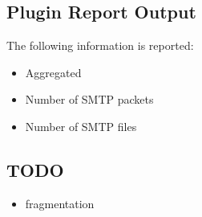 \documentclass[documentation]{subfiles}
\begin{document}
\subsection{Plugin Report Output}
The following information is reported:
\begin{itemize}
    \item Aggregated {\tt{}}
    \item Number of SMTP packets
    \item Number of SMTP files
\end{itemize}

\subsection{TODO}
\begin{itemize}
    \item fragmentation
\end{itemize}
\end{document}
